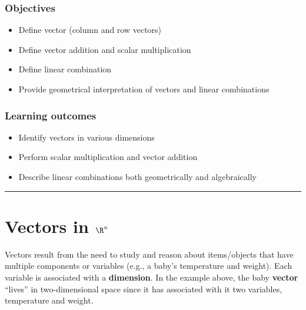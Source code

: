 %


\subsubsection*{Objectives}
\begin{itemize}
	\item Define vector (column and row vectors)
	\item Define vector addition and scalar multiplication 
	\item Define linear combination
	\item Provide geometrical interpretation of vectors and linear combinations
\end{itemize}



\subsubsection*{Learning outcomes}
\begin{itemize}
	\item Identify vectors in various dimensions
	\item Perform scalar multiplication and vector addition
	\item Describe linear combinations both geometrically and algebraically
	
    
\end{itemize}





\rule[0.01in]{\textwidth}{0.0025in}


\section{Vectors in $\R^n$}
Vectors result from the need to study and reason about items/objects that have multiple components or variables (e.g., a baby's temperature and weight).  Each variable is associated with a \textbf{dimension}.  In the example above, the baby \textbf{vector} ``lives'' in two-dimensional space since it has associated with it two variables, temperature and weight.  

